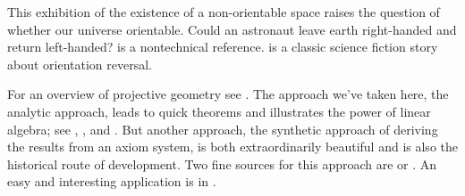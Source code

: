 This exhibition of the existence of a 
non-orientable space raises the question of whether our universe
orientable.
Could 
an astronaut leave earth right-handed and return left-handed?
\cite{Gardner} is a nontechnical reference.
\cite{Clarke} is a classic science fiction story about 
orientation reversal.

For an overview of projective geometry see \cite{CourantRobbins}. 
The approach we've taken here, the analytic approach,
leads to quick theorems and %
illustrates 
the power of linear algebra; see \cite{Hanes}, \cite{Ryan}, and
\cite{Eggar}.
But another approach, the 
synthetic approach of deriving the results
from an axiom system, is both extraordinarily
beautiful and is also the historical route of development.
Two fine sources for this approach are \cite{Coxeter} or \cite{Seidenberg}.
An easy and interesting application is in \cite{Davies}.

